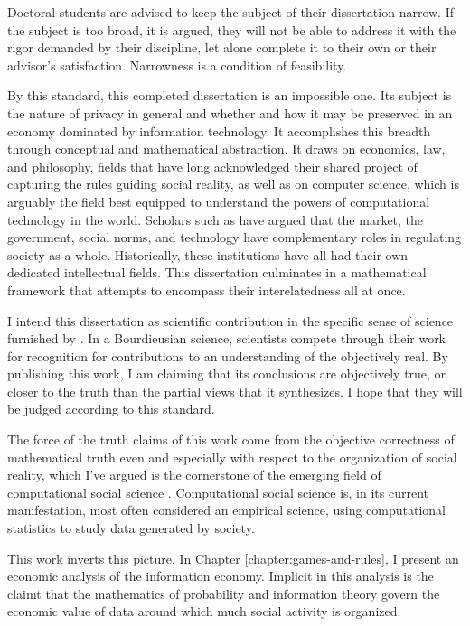 \documentclass[../thesis.tex]{subfiles}
\begin{document}
 Doctoral students are advised to keep the subject of their
 dissertation narrow.
 If the subject is too broad, it is argued, they will not be
 able to address it with the rigor demanded by their discipline,
 let alone complete it to their own or their advisor's satisfaction.
 Narrowness is a condition of feasibility.

 By this standard, this completed dissertation is an impossible
 one.
 Its subject is the nature of privacy in general and whether and how it may be preserved in an economy dominated by information technology.
 It accomplishes this breadth through conceptual and mathematical
 abstraction.
 It draws on economics, law, and philosophy, fields that have long acknowledged their shared project of capturing the rules guiding social reality, as well as on computer science, which is arguably the field best equipped to understand the powers of computational technology in the world.
 Scholars such as \citet{lessig1999code} have argued that the market, the government, social norms, and technology have complementary roles in regulating society as a whole.
 Historically, these institutions have all had their own dedicated intellectual fields.
 This dissertation culminates in a mathematical framework that attempts to encompass their interelatedness all at once.

 I intend this dissertation as scientific contribution
 in the specific sense of science furnished by
 \citet{bourdieu2004science}.
 In a Bourdieusian science, scientists compete through their work
 for recognition for contributions to an understanding of the
 objectively real.
 By publishing this work, I am claiming that its conclusions
 are objectively true, or closer to the truth than the partial
 views that it synthesizes.
 I hope that they will be judged according to this standard.

 The force of the truth claims of this work come from the
 objective correctness of mathematical truth even and especially
 with respect to the organization of social reality, which I've
 argued is the cornerstone of the emerging field of
 computational social science \citep{benthall2016philosophy}.
 Computational social science is, in its current manifestation,
 most often considered an empirical science, using computational
 statistics to study data generated by society.

 This work inverts this picture.
 In Chapter \ref{chapter:games-and-rules}, I present
 an economic analysis of the information economy.
 Implicit in this analysis is the claimt that
 the mathematics of probability and information theory
 govern the economic value of data around which much
 social activity is organized.
\end{document}
